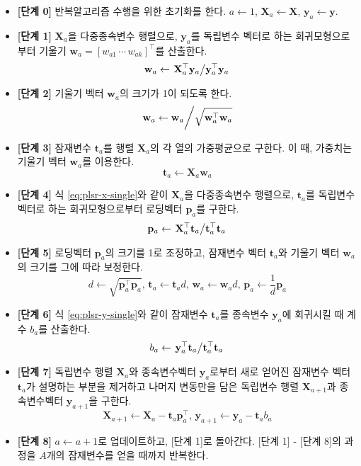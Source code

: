 \documentclass[
]{book}
\providecommand{\tightlist}{%
  \setlength{\itemsep}{0pt}\setlength{\parskip}{0pt}}
\begin{document}
\begin{itemize}
\tightlist
\item
  \textbf{{[}단계 0{]}} 반복알고리즘 수행을 위한 초기화를 한다. \(a \leftarrow 1\), \(\mathbf{X}_a \leftarrow \mathbf{X}\), \(\mathbf{y}_a \leftarrow \mathbf{y}\).
\item
  \textbf{{[}단계 1{]}} \(\mathbf{X}_a\)을 다중종속변수 행렬으로, \(\mathbf{y}_a\)를 독립변수 벡터로 하는 회귀모형으로부터 기울기 \(\mathbf{w}_a = [w_{a1} \, \cdots \, w_{ak}]^\top\)를 산출한다.
  \[\mathbf{w}_a \leftarrow \left. \mathbf{X}_a^\top \mathbf{y}_a \middle/ \mathbf{y}_a^\top \mathbf{y}_a \right.  \]
\item
  \textbf{{[}단계 2{]}} 기울기 벡터 \(\mathbf{w}_a\)의 크기가 1이 되도록 한다.
  \[\left. \mathbf{w}_a \leftarrow \mathbf{w}_a \middle/ \sqrt{\mathbf{w}_a^\top \mathbf{w}_a} \right.\]
\item
  \textbf{{[}단계 3{]}} 잠재변수 \(\mathbf{t}_a\)를 행렬 \(\mathbf{X}_a\)의 각 열의 가중평균으로 구한다. 이 때, 가중치는 기울기 벡터 \(\mathbf{w}_a\)를 이용한다.
  \[\mathbf{t}_a \leftarrow \mathbf{X}_a \mathbf{w}_a\]
\item
  \textbf{{[}단계 4{]}} 식 \eqref{eq:plsr-x-single}와 같이 \(\mathbf{X}_a\)을 다중종속변수 행렬으로, \(\mathbf{t}_a\)를 독립변수 벡터로 하는 회귀모형으로부터 로딩벡터 \(\mathbf{p}_a\)를 구한다.
  \[\mathbf{p}_a \leftarrow \left. \mathbf{X}_a^\top \mathbf{t}_a \middle/ \mathbf{t}_a^\top \mathbf{t}_a \right.\]
\item
  \textbf{{[}단계 5{]}} 로딩벡터 \(\mathbf{p}_a\)의 크기를 1로 조정하고, 잠재변수 벡터 \(\mathbf{t}_a\)와 기울기 벡터 \(\mathbf{w}_a\)의 크기를 그에 따라 보정한다.
  \[d \leftarrow \sqrt{\mathbf{p}_a^\top \mathbf{p}_a}, \, \mathbf{t}_a \leftarrow \mathbf{t}_a d, \, \mathbf{w}_a \leftarrow \mathbf{w}_a d, \, \mathbf{p}_a \leftarrow \frac{1}{d} \mathbf{p}_a \]
\item
  \textbf{{[}단계 6{]}} 식 \eqref{eq:plsr-y-single}와 같이 잠재변수 \(\mathbf{t}_a\)를 종속변수 \(\mathbf{y}_a\)에 회귀시킬 때 계수 \(b_a\)를 산출한다.
  \[b_a \leftarrow \left. \mathbf{y}_a^\top \mathbf{t}_a \middle/ \mathbf{t}_a^\top \mathbf{t}_a \right. \]
\item
  \textbf{{[}단계 7{]}} 독립변수 행렬 \(\mathbf{X}_a\)와 종속변수벡터 \(\mathbf{y}_a\)로부터 새로 얻어진 잠재변수 벡터 \(\mathbf{t}_a\)가 설명하는 부분을 제거하고 나머지 변동만을 담은 독립변수 행렬 \(\mathbf{X}_{a + 1}\)과 종속변수벡터 \(\mathbf{y}_{a + 1}\)을 구한다.
  \[\mathbf{X}_{a + 1} \leftarrow \mathbf{X}_a - \mathbf{t}_a \mathbf{p}_a^\top, \, \mathbf{y}_{a + 1} \leftarrow \mathbf{y}_a - \mathbf{t}_a b_a\]
\item
  \textbf{{[}단계 8{]}} \(a \leftarrow a + 1\)로 업데이트하고, {[}단계 1{]}로 돌아간다. {[}단계 1{]} - {[}단계 8{]}의 과정을 \(A\)개의 잠재변수를 얻을 때까지 반복한다.
\end{itemize}
\end{document}
